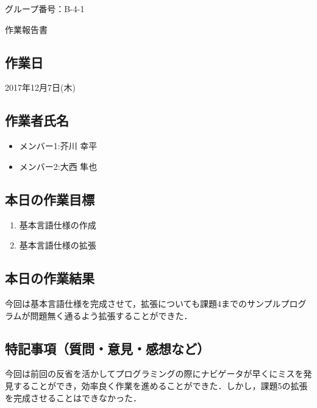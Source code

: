 \documentclass[a4j]{jarticle}
\begin{document}
\thispagestyle{empty}

\begin{flushright}
グループ番号：B-4-1
\end{flushright}

\begin{center}
{\LARGE 作業報告書}
\end{center}

\subsection*{作業日}

2017年12月7日(木)


\subsection*{作業者氏名}

\begin{itemize}
  \item メンバー1:芥川 幸平
  \item メンバー2:大西 隼也
\end{itemize}

\subsection*{本日の作業目標}
\begin{enumerate}
\item 基本言語仕様の作成
\item 基本言語仕様の拡張
\end{enumerate}

\subsection*{本日の作業結果}
今回は基本言語仕様を完成させて，拡張についても課題4までのサンプルプログラムが問題無く通るよう拡張することができた．

\subsection*{特記事項（質問・意見・感想など）}
今回は前回の反省を活かしてプログラミングの際にナビゲータが早くにミスを発見することができ，効率良く作業を進めることができた．しかし，課題5の拡張を完成させることはできなかった．
\end{document}
